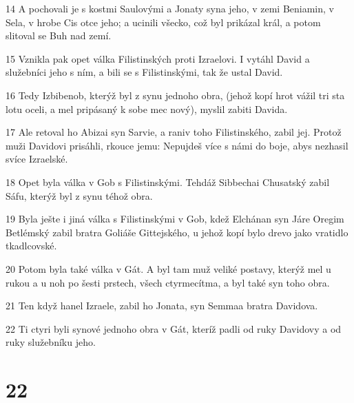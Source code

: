 \par 14 A pochovali je s kostmi Saulovými a Jonaty syna jeho, v zemi Beniamin, v Sela, v hrobe Cis otce jeho; a ucinili všecko, což byl prikázal král, a potom slitoval se Buh nad zemí.
\par 15 Vznikla pak opet válka Filistinských proti Izraelovi. I vytáhl David a služebníci jeho s ním, a bili se s Filistinskými, tak že ustal David.
\par 16 Tedy Izbibenob, kterýž byl z synu jednoho obra, (jehož kopí hrot vážil tri sta lotu oceli, a mel pripásaný k sobe mec nový), myslil zabiti Davida.
\par 17 Ale retoval ho Abizai syn Sarvie, a raniv toho Filistinského, zabil jej. Protož muži Davidovi prisáhli, rkouce jemu: Nepujdeš více s námi do boje, abys nezhasil svíce Izraelské.
\par 18 Opet byla válka v Gob s Filistinskými. Tehdáž Sibbechai Chusatský zabil Sáfu, kterýž byl z synu téhož obra.
\par 19 Byla ješte i jiná válka s Filistinskými v Gob, kdež Elchánan syn Járe Oregim Betlémský zabil bratra Goliáše Gittejského, u jehož kopí bylo drevo jako vratidlo tkadlcovské.
\par 20 Potom byla také válka v Gát. A byl tam muž veliké postavy, kterýž mel u rukou a u noh po šesti prstech, všech ctyrmecítma, a byl také syn toho obra.
\par 21 Ten když hanel Izraele, zabil ho Jonata, syn Semmaa bratra Davidova.
\par 22 Ti ctyri byli synové jednoho obra v Gát, kteríž padli od ruky Davidovy a od ruky služebníku jeho.

\chapter{22}

